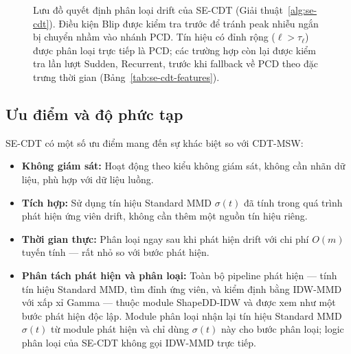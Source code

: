 \begin{figure}[H]
{}
	\caption[Lưu đồ phân loại drift của SE-CDT]{Lưu đồ quyết định phân loại drift của SE-CDT (Giải thuật~\ref{alg:se-cdt}). Điều kiện Blip được kiểm tra trước để tránh peak nhiễu ngắn bị chuyển nhầm vào nhánh PCD. Tín hiệu có đỉnh rộng ($\ell > \tau_\ell$) được phân loại trực tiếp là PCD; các trường hợp còn lại được kiểm tra lần lượt Sudden, Recurrent, trước khi fallback về PCD theo đặc trưng thời gian (Bảng~\ref{tab:se-cdt-features}).}
	\label{fig:se-cdt-flowchart}
\end{figure}

\subsection{Ưu điểm và độ phức tạp}

SE-CDT có một số ưu điểm mang đến sự khác biệt so với CDT-MSW:
\begin{itemize}
	\item \textbf{Không giám sát:} Hoạt động theo kiểu không giám sát, không cần nhãn dữ liệu, phù hợp với dữ liệu luồng.
	\item \textbf{Tích hợp:} Sử dụng tín hiệu Standard MMD $\sigma(t)$ đã tính trong quá trình phát hiện ứng viên drift, không cần thêm một nguồn tín hiệu riêng.
	\item \textbf{Thời gian thực:} Phân loại ngay sau khi phát hiện drift với chi phí $O(m)$ tuyến tính --- rất nhỏ so với bước phát hiện.
	\item \textbf{Phân tách phát hiện và phân loại:} Toàn bộ pipeline phát hiện --- tính tín hiệu Standard MMD, tìm đỉnh ứng viên, và kiểm định bằng IDW-MMD với xấp xỉ Gamma --- thuộc module ShapeDD-IDW và được xem như một bước phát hiện độc lập. Module phân loại nhận lại tín hiệu Standard MMD $\sigma(t)$ từ module phát hiện và chỉ dùng $\sigma(t)$ này cho bước phân loại; logic phân loại của SE-CDT không gọi IDW-MMD trực tiếp.
\end{itemize}

